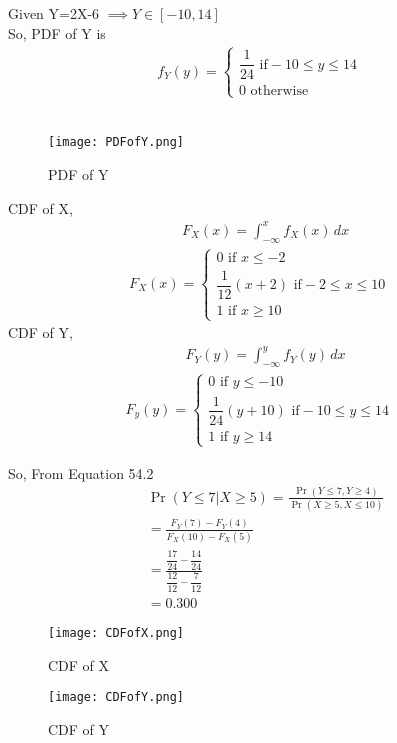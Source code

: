 \documentclass[journal,12pt,twocolumn]{IEEEtran}
\begin{document}
Given Y=2X-6
$\implies Y \in [-10,14] $\\
So, PDF of Y is 
\begin{align}
 \tag{54.4}
  f_Y(y)=\begin{cases}
  \dfrac{1}{24} \text{ if} -10\leq y \leq 14\\
  0  \text{   otherwise}
  \end{cases}
\end{align}\\
\begin{figure}[h]
    \centering
    \texttt{[image: PDFofY.png]}
    \caption{PDF of Y}
    \label{fig:my_label}
\end{figure}

CDF of X,
\begin{align*}
    &F_X(x)=\int_{-\infty}^{x}f_X(x)\,dx
\end{align*}
\begin{align*}
  F_X(x)=\begin{cases}
  0  \text{ if } x\leq-2\\
  \dfrac{1}{12}(x+2) \text{ if} -2\leq x \leq 10\\
  1 \text{  if }  x \geq 10
  \end{cases}
\end{align*}
CDF of Y,
\begin{align*}
    &F_Y(y)=\int_{-\infty}^{y}f_Y(y)\,dx
\end{align*}
\begin{align*}
  F_y(y)=\begin{cases}
  0  \text{ if } y\leq-10\\
  \dfrac{1}{24}(y+10) \text{ if} -10\leq y \leq 14\\
  1 \text{  if }  y \geq 14
  \end{cases}
\end{align*}

So,  From Equation 54.2
\begin{align*}
&\Pr(Y\leq7|X\geq5)=\frac{\Pr(Y\leq7,Y\geq4)}{\Pr(X\geq5,X\leq10)}\\
&=\frac{F_Y(7)-F_Y(4)}{F_X(10)-F_X(5)}\\
&=\frac{\dfrac{17}{24}-\dfrac{14}{24}}{\dfrac{12}{12}-\dfrac{7}{12}}\\
&=0.300
\end{align*}
\begin{figure}[h]
    \centering
    \texttt{[image: CDFofX.png]}
    \caption{CDF of X}
    \label{fig:my_label}
\end{figure}

\begin{figure}[h]
    \centering
    \texttt{[image: CDFofY.png]}
    \caption{CDF of Y}
    \label{fig:my_label}
\end{figure}
\end{document}

